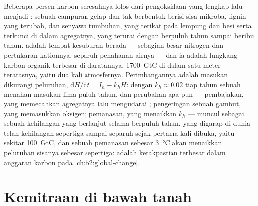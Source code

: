\begin{proposition}\label{prop:b2:living-soil:humus}
Beberapa persen karbon seresahnya lolos dari pengoksidaan yang lengkap
lalu menjadi \emph{}: sebuah campuran gelap dan tak berbentuk
berisi sisa mikroba, lignin yang terubah, dan senyawa tumbuhan, yang
terikat pada lempung dan besi serta terkunci di dalam agregatnya, yang
terurai dengan  berpuluh tahun sampai beribu tahun. 
adalah tempat kesuburan  berada --- sebagian besar nitrogen
dan pertukaran kationnya, separuh penahanan airnya --- dan ia adalah
lungkang karbon organik terbesar di daratannya, \qty{1700}{GtC} di
dalam satu meter teratasnya, yaitu dua kali atmosfernya. Perimbangannya
adalah masukan dikurangi peluruhan, $\mathrm{d}H/\mathrm{d}t = I_h - k_hH$: dengan $k_h \approx 0.02$ tiap tahun sebuah  menahan
masukan lima puluh tahun, dan perubahan apa pun --- pembajakan, yang
memecahkan agregatnya lalu mengudarai ; pengeringan sebuah
gambut, yang memasukkan oksigen; pemanasan, yang menaikkan $k_h$ ---
muncul sebagai sebuah kehilangan yang berlanjut selama berpuluh tahun.
 yang digarap di dunia telah kehilangan sepertiga sampai separuh
 sejak  pertama kali dibuka, yaitu sekitar
\qty{100}{GtC}, dan sebuah pemanasan sebesar \qty{3}{\celsius} akan
menaikkan peluruhan sisanya sebesar sepertiga:  adalah
ketakpastian terbesar dalam anggaran karbon pada
\cref{ch:b2:global-change}.
\end{proposition}

\section{Kemitraan di bawah tanah}

